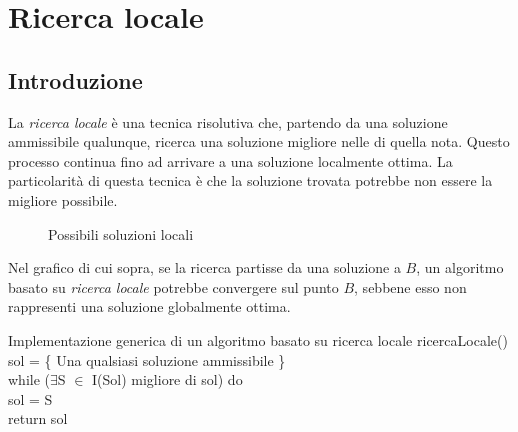 \chapter{Ricerca locale}
\section{Introduzione}
La \emph{ricerca locale} è una tecnica risolutiva che, partendo da una soluzione
ammissibile qualunque, ricerca una soluzione migliore nelle  di
quella nota. Questo processo continua fino ad arrivare a una soluzione localmente
ottima. La particolarità di questa tecnica è che la soluzione trovata potrebbe
non essere la migliore possibile.

\begin{figure}[h!]
\centering
{}
\caption{Possibili soluzioni locali}
\end{figure}

\noindent
Nel grafico di cui sopra, se la ricerca partisse da una soluzione  a
$B$, un algoritmo basato su \emph{ricerca locale} potrebbe convergere sul punto
$B$, sebbene esso non rappresenti una soluzione globalmente ottima.

\begin{minicode}{Implementazione generica di un algoritmo basato su ricerca locale}
\ind{} ricercaLocale()\\
     sol = \{ Una qualsiasi soluzione ammissibile \}\\
    \indf while ($\exists$S $\in$ I(Sol) migliore di sol) do\\
        sol = S\\
    \indf return sol
\end{minicode}

